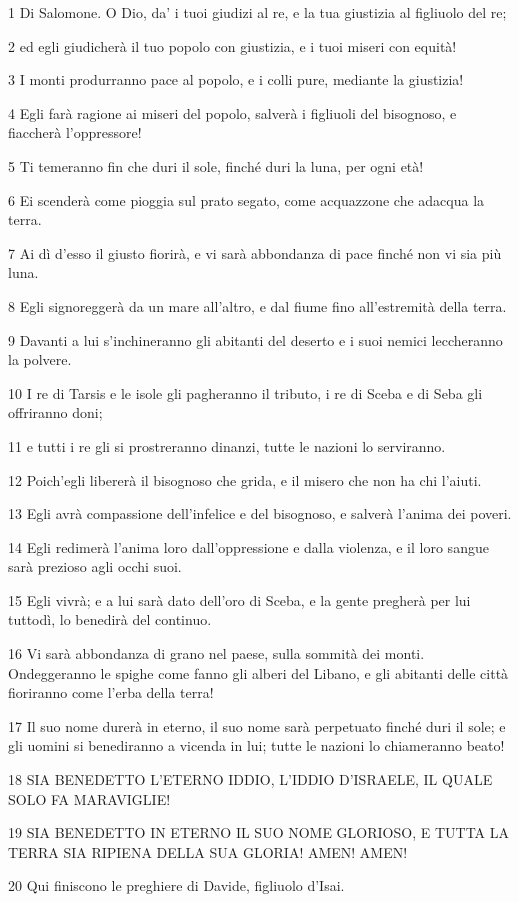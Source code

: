 \par 1 Di Salomone. O Dio, da' i tuoi giudizi al re, e la tua giustizia al figliuolo del re;
\par 2 ed egli giudicherà il tuo popolo con giustizia, e i tuoi miseri con equità!
\par 3 I monti produrranno pace al popolo, e i colli pure, mediante la giustizia!
\par 4 Egli farà ragione ai miseri del popolo, salverà i figliuoli del bisognoso, e fiaccherà l'oppressore!
\par 5 Ti temeranno fin che duri il sole, finché duri la luna, per ogni età!
\par 6 Ei scenderà come pioggia sul prato segato, come acquazzone che adacqua la terra.
\par 7 Ai dì d'esso il giusto fiorirà, e vi sarà abbondanza di pace finché non vi sia più luna.
\par 8 Egli signoreggerà da un mare all'altro, e dal fiume fino all'estremità della terra.
\par 9 Davanti a lui s'inchineranno gli abitanti del deserto e i suoi nemici leccheranno la polvere.
\par 10 I re di Tarsis e le isole gli pagheranno il tributo, i re di Sceba e di Seba gli offriranno doni;
\par 11 e tutti i re gli si prostreranno dinanzi, tutte le nazioni lo serviranno.
\par 12 Poich'egli libererà il bisognoso che grida, e il misero che non ha chi l'aiuti.
\par 13 Egli avrà compassione dell'infelice e del bisognoso, e salverà l'anima dei poveri.
\par 14 Egli redimerà l'anima loro dall'oppressione e dalla violenza, e il loro sangue sarà prezioso agli occhi suoi.
\par 15 Egli vivrà; e a lui sarà dato dell'oro di Sceba, e la gente pregherà per lui tuttodì, lo benedirà del continuo.
\par 16 Vi sarà abbondanza di grano nel paese, sulla sommità dei monti. Ondeggeranno le spighe come fanno gli alberi del Libano, e gli abitanti delle città fioriranno come l'erba della terra!
\par 17 Il suo nome durerà in eterno, il suo nome sarà perpetuato finché duri il sole; e gli uomini si benediranno a vicenda in lui; tutte le nazioni lo chiameranno beato!
\par 18 SIA BENEDETTO L'ETERNO IDDIO, L'IDDIO D'ISRAELE, IL QUALE SOLO FA MARAVIGLIE!
\par 19 SIA BENEDETTO IN ETERNO IL SUO NOME GLORIOSO, E TUTTA LA TERRA SIA RIPIENA DELLA SUA GLORIA! AMEN! AMEN!
\par 20 Qui finiscono le preghiere di Davide, figliuolo d'Isai.


